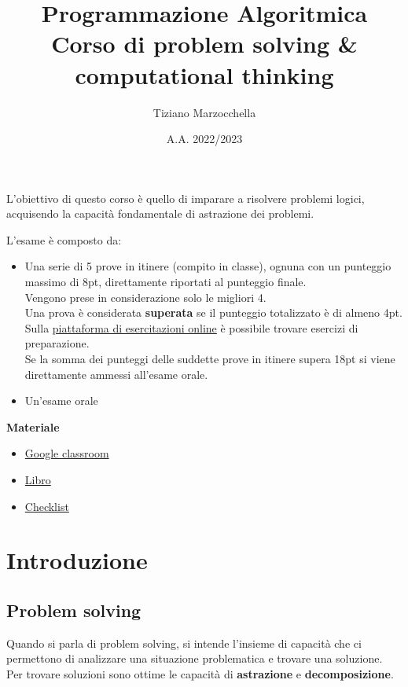 \documentclass{article}
\title{
    Programmazione Algoritmica \\
    \large Corso di problem solving \& computational thinking
}
\author{Tiziano Marzocchella}
\date{A.A. 2022/2023}
\begin{document}


\noindent L'obiettivo di questo corso è quello di imparare a risolvere problemi logici, acquisendo la capacità fondamentale di astrazione dei problemi.

\noindent L'esame è composto da:
\begin{itemize}
    \item Una serie di 5 prove in itinere (compito in classe), ognuna con un punteggio massimo di 8pt, direttamente riportati al punteggio finale.\\
          Vengono prese in considerazione solo le migliori 4.\\
          Una prova è considerata \textbf{superata} se il punteggio totalizzato è di almeno 4pt.\\
          Sulla \href{https://evo.di.unipi.it/student/courses/7/practices}{piattaforma di esercitazioni online} è possibile trovare esercizi di preparazione.\\
          Se la somma dei punteggi delle suddette prove in itinere supera 18pt si viene direttamente ammessi all'esame orale.
    \item Un'esame orale
\end{itemize}

\noindent\textbf{Materiale}
\begin{itemize}
    \item \href{https://classroom.google.com/c/NDg5NzMxMzU4ODAx?cjc=qwfm6jd}{Google classroom}
    \item \href{https://t.me/c/1708877199/46}{Libro}
    \item \href{https://docs.google.com/document/d/1XU_2rwPUkni_s4h8Q-bLkLF9nwT4dSQA4DjgBqMaulg/edit?usp=drive_web&authuser=0}{Checklist}
\end{itemize}

\pagebreak %

\section{Introduzione}
\subsection{Problem solving}
Quando si parla di problem solving, si intende l'insieme di capacità che ci permettono di analizzare una situazione problematica e trovare una soluzione.\\
Per trovare soluzioni sono ottime le capacità di \textbf{astrazione} e \textbf{decomposizione}.
\end{document}
